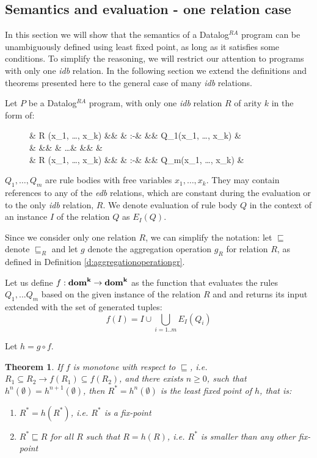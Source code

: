 \documentclass{pracamgr}
\theoremstyle{plain}
\newtheorem{thm}{Theorem}[section]
\theoremstyle{definition}
\theoremstyle{remark}
\newcommand{\datalogra}{Datalog$^{RA}$ }
\newcommand{\assign}{:-}
\newcommand{\narrow}[1]{\begin{changemargin}{2cm}{2cm} #1 \end{changemargin}}
\begin{document}
\subsection{Semantics and evaluation - one relation case}\label{ss:semeval1rel}
In this section we will show that the semantics of a \datalogra program can be unambiguously defined using least fixed point, as long as it satisfies some conditions. To simplify the reasoning, we will restrict our attention to programs with only one \emph{idb} relation. In the following section we extend the definitions and theorems presented here to the general case of many \emph{idb} relations.

Let $P$ be a \datalogra program, with only one \emph{idb} relation $R$ of arity $k$ in the form of:

\begin{figure}[h!]
\narrow{
  \begin{flalign*}
  & \textsc{R} (x_1, \dots, x_k) &&  & \assign & && Q_1(x_1, \dots, x_k) & \\
  &  &&  & \dots & && & \\
  & \textsc{R} (x_1, \dots, x_k) &&  & \assign & && Q_m(x_1, \dots, x_k) & \\
  \end{flalign*}
}
\end{figure}

$Q_1, \dots, Q_m$ are rule bodies with free variables $x_1, \dots, x_k$. They may contain references to any of the \emph{edb} relations, which are constant during the evaluation or to the only \emph{idb} relation, $R$. We denote evaluation of rule body $Q$ in the context of an instance $I$ of the relation $Q$ as $E_I(Q)$.

Since we consider only one relation $R$, we can simplify the notation: let $\sqsubseteq$ denote $\sqsubseteq_R$ and let $g$ denote the aggregation operation $g_R$ for relation $R$, as defined in Definition \ref{d:aggregationoperationgr}.

Let us define $f: \bf{dom}^k \to \bf{dom}^k$ as the function that evaluates the rules $Q_1, ... Q_m$ based on the given instance of the relation $R$ and and returns its input extended with the set of generated tuples:
$$ f(I) = I \cup \bigcup_{i=1..m} E_I(Q_i) $$

Let $h = g \circ f$. 


\begin{thm}
If $f$ is monotone with respect to $\sqsubseteq$, i.e. $R_1 \subseteq R_2 \rightarrow f(R_1) \subseteq f(R_2)$, and there exists $n \ge 0 $, such that $h^n(\emptyset) = h^{n+1}(\emptyset)$, then $R^* = h^n(\emptyset)$ is the least fixed point of $h$, that is:
\begin{enumerate}
\item $R^* = h(R^*)$, i.e. $R^*$ is a fix-point
\item $R^* \sqsubseteq R$ for all $R$ such that $R = h(R)$, i.e. $R^*$ is smaller than any other fix-point
\end{enumerate}
\end{thm}
\end{document}
